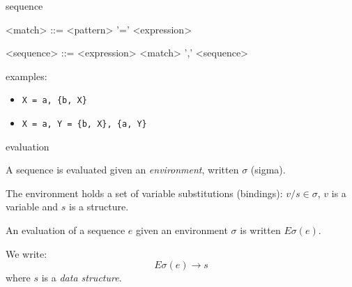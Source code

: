 \begin{frame}{sequence}

\begin{grammar}
  <match> ::=  <pattern> '=' <expression>
\end{grammar}

\pause
\begin{grammar}
  <sequence> ::=  <expression> \alt <match> ',' <sequence>
\end{grammar}

\pause\vspace{20pt}

examples:
 \begin{itemize}
   \pause \item {\tt X = a, \{b, X\}}
   \pause \item {\tt X = a, Y = \{b, X\}, \{a, Y\}}
 \end{itemize}

\end{frame}

\begin{frame}{evaluation}

A sequence is evaluated given an {\em environment}, written $\sigma$ (sigma).

\pause\vspace{20pt}
The environment holds a set of variable substitutions (bindings):
$v/s \in \sigma$, $v$ is a variable and $s$ is a structure.

\pause\vspace{20pt} 
An evaluation of a sequence $e$ given an environment
$\sigma$ is written $E\sigma(e)$. 

\pause\vspace{20pt}
We write:
\vspace{20pt}
$$E\sigma(e) \rightarrow s$$
\vspace{20pt}
where $s$ is a {\em data structure}.

\end{frame}

